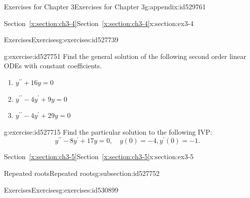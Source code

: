 \documentclass[oneside,10pt,]{book}
\newcommand{\xreffont}{\relax}
\numberwithin{equation}{section}
\numberwithin{equation}{section}
\begin{document}
\begin{appendixptx}{Exercises for Chapter 3}{}{Exercises for Chapter 3}{}{}{g:appendix:id529761}
\typeout{************************************************}
%
\begin{sectionptx}{Section~{\xreffont\ref*{x:section:ch3-4}}}{}{Section~{\xreffont\ref*{x:section:ch3-4}}}{}{}{x:section:ex3-4}
%
%
\typeout{************************************************}
\typeout{************************************************}
%
\begin{exercises-subsection-numberless}{Exercises}{}{Exercises}{}{}{g:exercises:id527739}
\begin{divisionexercise}{1}{}{}{g:exercise:id527751}%
Find the general solution of the following second order linear ODEs with constant coefficients.%
%
\begin{enumerate}[label=(\alph*)]
\item{}\(\displaystyle y^{\prime\prime}+16y=0\)%
\item{}\(\displaystyle y^{\prime\prime}-4y^{\prime}+9y=0\)%
\item{}\(\displaystyle y^{\prime\prime}-4y^{\prime}+29y=0\)%
\end{enumerate}
\end{divisionexercise}%
\begin{divisionexercise}{2}{}{}{g:exercise:id527715}%
Find the particular solution to the following IVP:%
%
\begin{equation*}
y^{\prime\prime}-8y^{\prime}+17y=0,\,\,\,\,\,\,y(0)=-4,y^{\prime}(0)=-1.
\end{equation*}
\end{divisionexercise}%
\end{exercises-subsection-numberless}
\end{sectionptx}
%
%
\typeout{************************************************}
\typeout{Section D.4 Section~{\xreffont\ref*{x:section:ch3-5}}}
\typeout{************************************************}
%
\begin{sectionptx}{Section~{\xreffont\ref*{x:section:ch3-5}}}{}{Section~{\xreffont\ref*{x:section:ch3-5}}}{}{}{x:section:ex3-5}
%
%
\typeout{************************************************}
\typeout{************************************************}
%
\begin{subsectionptx}{Repeated roots}{}{Repeated roots}{}{}{g:subsection:id527752}
%
%
\typeout{************************************************}
\typeout{************************************************}
%
\begin{exercises-subsubsection-numberless}{Exercises}{}{Exercises}{}{}{g:exercises:id530899}

\end{exercises-subsubsection-numberless}
\end{subsectionptx}
\end{sectionptx}
\end{appendixptx}
\end{document}
